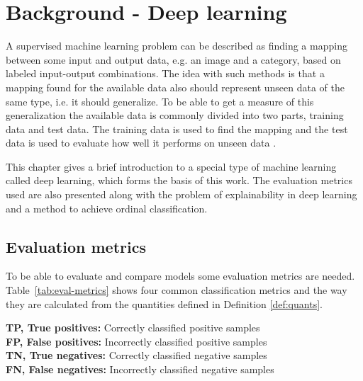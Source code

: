 \chapter{Background - Deep learning} \label{ch:dl}

A supervised machine learning problem can be described as finding a mapping between some input and output data, e.g. an image and a category, based on labeled input-output combinations. The idea with such methods is that a mapping found for the available data also should represent unseen data of the same type, i.e. it should generalize. To be able to get a measure of this generalization the available data is commonly divided into two parts, training data and test data. The training data is used to find the mapping and the test data is used to evaluate how well it performs on unseen data \cite{Bishop2006}.

This chapter gives a brief introduction to a special type of machine learning called deep learning, which forms the basis of this work. The evaluation metrics used are also presented along with the problem of explainability in deep learning and a method to achieve ordinal classification.

\section{Evaluation metrics}
To be able to evaluate and compare models some evaluation metrics are needed. Table~\ref{tab:eval-metrics} shows four common classification metrics and the way they are calculated from the quantities defined in Definition \ref{def:quants}.

\begin{minipage}[t]{0.2\textwidth}
    \strut\vspace*{-\baselineskip}\begin{definition}
        \label{def:quants}
    \end{definition}
\end{minipage}\hspace{0.02}\begin{minipage}[t]{0.7\textwidth}
  \textbf{TP, True positives:} Correctly classified positive samples \\
  \textbf{FP, False positives:} Incorrectly classified positive samples \\
  \textbf{TN, True negatives:} Correctly classified negative samples \\
  \textbf{FN, False negatives:} Incorrectly classified negative samples \\
\end{minipage}

